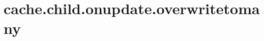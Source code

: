 \section{cache.child.onupdate.overwritetomany}
\label{configuration:CacheChildOnupdateOverwritetomany}
\AvailableInJavaAndCsharp{\TODO}